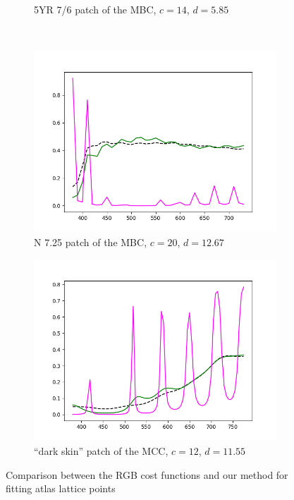 \begin{figure}[t]
\begin{subfigure}[t]{0.45\textwidth}
		\caption{5YR 7/6 patch of the MBC, $c = 14$, $d = 5.85$}
		\label{fig:resultsCostFunctions_mcb0706}
	\end{subfigure} 
	\vspace{0.5em}\\
	\begin{subfigure}[t]{0.45\textwidth}
		\includegraphics[width=\linewidth]{img/results_costFunctions_mcb0725.png}
		\caption{N 7.25 patch of the MBC, $c = 20$, $d = 12.67$}
		\label{fig:resultsCostFunctions_mcb0725}
	\end{subfigure} \hspace{0.1em}
	\begin{subfigure}[t]{0.45\textwidth}
		\includegraphics[width=\linewidth]{img/results_costFunctions_darkskin.png}
		\caption{``dark skin'' patch of the MCC, $c = 12$, $d = 11.55$}
		\label{fig:resultsCostFunctions_darkskin}
	\end{subfigure}
	\caption{Comparison between the RGB cost functions and our method for fitting atlas lattice points}
	\label{fig:resultsCostFunctions}
\end{figure}

